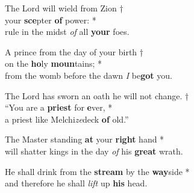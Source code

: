 The Lord will wield from Zion †\\
your \textbf{sce}pter \textbf{of} power: *\\
rule in the midst \emph{of} all \textbf{your} foes.

A prince from the day of your birth †\\
on the \textbf{ho}ly \textbf{moun}tains; *\\
from the womb before the dawn \emph{I} be\textbf{got} you.

The Lord has sworn an oath he will not change. †\\
“You are a \textbf{priest} for \textbf{e}ver, *\\
a priest like Melchi\emph{ze}deck \textbf{of} old.”

The Master standing \textbf{at} your \textbf{right} hand *\\
will shatter kings in the day \emph{of} his \textbf{great} wrath.

He shall drink from the \textbf{stream} by the \textbf{way}side *\\
and therefore he shall \emph{lift} up \textbf{his} head.